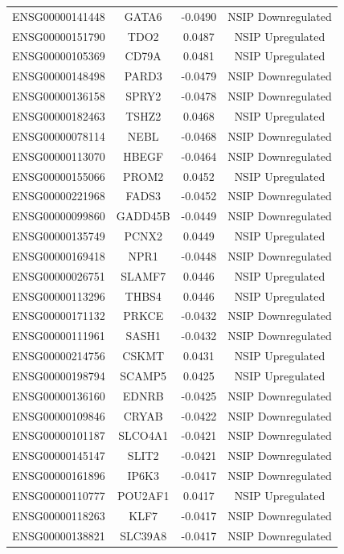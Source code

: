 \documentclass[
]{article}
\begin{document}
\begin{singlespace}
\begin{longtable}[t]{lccc}
ENSG00000141448 & GATA6 & -0.0490 & NSIP Downregulated\\
ENSG00000151790 & TDO2 & 0.0487 & NSIP Upregulated\\
ENSG00000105369 & CD79A & 0.0481 & NSIP Upregulated\\
ENSG00000148498 & PARD3 & -0.0479 & NSIP Downregulated\\
\addlinespace
ENSG00000136158 & SPRY2 & -0.0478 & NSIP Downregulated\\
ENSG00000182463 & TSHZ2 & 0.0468 & NSIP Upregulated\\
ENSG00000078114 & NEBL & -0.0468 & NSIP Downregulated\\
ENSG00000113070 & HBEGF & -0.0464 & NSIP Downregulated\\
ENSG00000155066 & PROM2 & 0.0452 & NSIP Upregulated\\
\addlinespace
ENSG00000221968 & FADS3 & -0.0452 & NSIP Downregulated\\
ENSG00000099860 & GADD45B & -0.0449 & NSIP Downregulated\\
ENSG00000135749 & PCNX2 & 0.0449 & NSIP Upregulated\\
ENSG00000169418 & NPR1 & -0.0448 & NSIP Downregulated\\
ENSG00000026751 & SLAMF7 & 0.0446 & NSIP Upregulated\\
\addlinespace
ENSG00000113296 & THBS4 & 0.0446 & NSIP Upregulated\\
ENSG00000171132 & PRKCE & -0.0432 & NSIP Downregulated\\
ENSG00000111961 & SASH1 & -0.0432 & NSIP Downregulated\\
ENSG00000214756 & CSKMT & 0.0431 & NSIP Upregulated\\
ENSG00000198794 & SCAMP5 & 0.0425 & NSIP Upregulated\\
\addlinespace
ENSG00000136160 & EDNRB & -0.0425 & NSIP Downregulated\\
ENSG00000109846 & CRYAB & -0.0422 & NSIP Downregulated\\
ENSG00000101187 & SLCO4A1 & -0.0421 & NSIP Downregulated\\
ENSG00000145147 & SLIT2 & -0.0421 & NSIP Downregulated\\
ENSG00000161896 & IP6K3 & -0.0417 & NSIP Downregulated\\
\addlinespace
ENSG00000110777 & POU2AF1 & 0.0417 & NSIP Upregulated\\
ENSG00000118263 & KLF7 & -0.0417 & NSIP Downregulated\\
ENSG00000138821 & SLC39A8 & -0.0417 & NSIP Downregulated\\

\end{longtable}
\end{singlespace}
\end{document}
